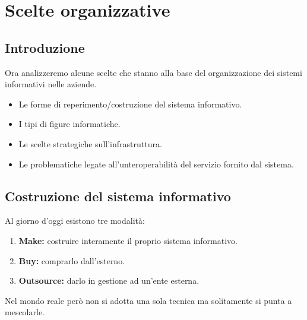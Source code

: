 \documentclass[../main.tex]{subfiles}
\begin{document}
	\chapter{Scelte organizzative}

	\section{Introduzione}
	Ora analizzeremo alcune scelte che stanno alla base del organizzazione dei sistemi informativi nelle aziende.
	\begin{itemize}
		\item Le forme di reperimento/costruzione del sistema informativo.
		\item I tipi di figure informatiche.
		\item Le scelte strategiche sull'infrastruttura.
		\item Le problematiche legate all'unteroperabilità del servizio fornito dal sistema.
	\end{itemize}

	\section{Costruzione del sistema informativo}
	Al giorno d'oggi esistono tre modalità:
	\begin{enumerate}
		\item \textbf{Make: } costruire interamente il proprio sistema informativo.
		\item \textbf{Buy: } comprarlo dall'esterno.
		\item \textbf{Outsource: } darlo in gestione ad un'ente esterna.
	\end{enumerate}
	Nel mondo reale però non si adotta una sola tecnica ma solitamente si punta a mescolarle.
\end{document}
